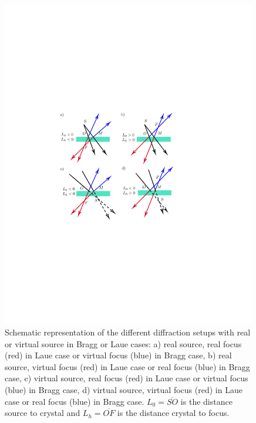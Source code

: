 \documentclass[preprint]{iucr}              %
\newcommand{\inred}[1]{{\color{red}#1}}
\begin{document}
\begin{figure}
\label{fig:geometries}
\caption{Schematic representation of the different diffraction setups with real or virtual source in Bragg or Laue \inred{cases}:
a) real source, real focus (red) in Laue case \inred{or} virtual focus (blue) in Bragg case,
b) real source, virtual focus (red) in Laue case \inred{or} real focus (blue) in Bragg case,
c) virtual source, real focus (red) in Laue case \inred{or} virtual focus (blue) in Bragg case,  
d) virtual source, virtual focus (red) in Laue case \inred{or} real focus (blue) in Bragg case.
\inred{$L_0=\overline{SO}$ is the distance source to crystal and $L_h=\overline{OF}$ is the distance crystal to focus.}
}
\includegraphics[width=0.99\textwidth,trim=4cm 9cm 6cm 9cm,clip=true]{fig1.pdf}
\end{figure}
\end{document}
